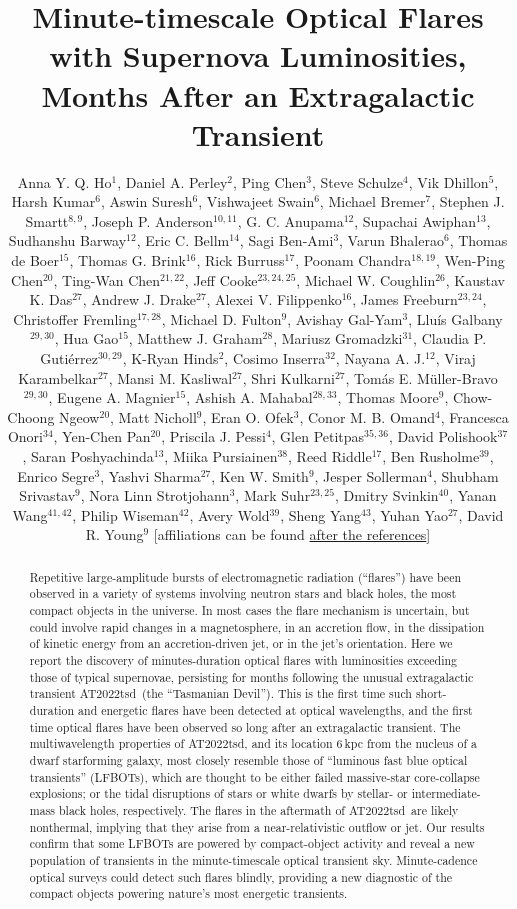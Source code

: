 \documentclass{nature_plusfigure}
\title{Minute-timescale Optical Flares with Supernova Luminosities, Months After an Extragalactic Transient}
\author{Anna Y. Q. Ho$^{1}$, Daniel A. Perley$^{2}$, Ping Chen$^{3}$, Steve Schulze$^{4}$, Vik Dhillon$^{5}$, Harsh Kumar$^{6}$, Aswin Suresh$^{6}$, Vishwajeet Swain$^{6}$, Michael Bremer$^{7}$, Stephen J. Smartt$^{8,9}$, Joseph P. Anderson$^{10,11}$, G. C. Anupama$^{12}$, Supachai Awiphan$^{13}$, Sudhanshu Barway$^{12}$, Eric C. Bellm$^{14}$, Sagi Ben-Ami$^{3}$, Varun Bhalerao$^{6}$, Thomas de Boer$^{15}$, Thomas G. Brink$^{16}$, Rick Burruss$^{17}$, Poonam Chandra$^{18,19}$, Wen-Ping Chen$^{20}$, Ting-Wan Chen$^{21,22}$, Jeff Cooke$^{23,24,25}$, Michael W. Coughlin$^{26}$, Kaustav K. Das$^{27}$, Andrew J. Drake$^{27}$, Alexei V. Filippenko$^{16}$, James Freeburn$^{23,24}$, Christoffer Fremling$^{17,28}$, Michael D. Fulton$^{9}$, Avishay Gal-Yam$^{3}$, Llu\'is Galbany$^{29,30}$, Hua Gao$^{15}$, Matthew J. Graham$^{28}$, Mariusz Gromadzki$^{31}$, Claudia P. Guti\'errez$^{30,29}$, K-Ryan Hinds$^{2}$, Cosimo Inserra$^{32}$, Nayana A. J.$^{12}$, Viraj Karambelkar$^{27}$, Mansi M. Kasliwal$^{27}$, Shri Kulkarni$^{27}$, Tom\'as E. M\"uller-Bravo$^{29,30}$, Eugene A. Magnier$^{15}$, Ashish A. Mahabal$^{28,33}$, Thomas Moore$^{9}$, Chow-Choong Ngeow$^{20}$, Matt Nicholl$^{9}$, Eran O. Ofek$^{3}$, Conor M. B. Omand$^{4}$, Francesca Onori$^{34}$, Yen-Chen Pan$^{20}$, Priscila J. Pessi$^{4}$, Glen Petitpas$^{35,36}$, David Polishook$^{37}$, Saran Poshyachinda$^{13}$, Miika Pursiainen$^{38}$, Reed Riddle$^{17}$, Ben Rusholme$^{39}$, Enrico Segre$^{3}$, Yashvi Sharma$^{27}$, Ken W. Smith$^{9}$, Jesper Sollerman$^{4}$, Shubham Srivastav$^{9}$, Nora Linn Strotjohann$^{3}$, Mark Suhr$^{23,25}$, Dmitry Svinkin$^{40}$, Yanan Wang$^{41,42}$, Philip Wiseman$^{42}$, Avery Wold$^{39}$, Sheng Yang$^{43}$, Yuhan Yao$^{27}$, David R. Young$^{9}$
[affiliations can be found \hyperref[sec:affiliations]{after the references}]
	}
\newcommand{\at}{AT2022tsd}
\begin{document}
\maketitle

\begin{abstract}

Repetitive large-amplitude bursts of electromagnetic radiation (``flares'') have been observed in a variety of systems involving neutron stars and black holes\cite{Fender1997,Hurley1999,Marrone2008,Racusin2008,Kasliwal2008,CastroTirado2008,Stefanescu2008,Nesci2021}, the most compact objects in the universe. In most cases the flare mechanism is uncertain, but could involve rapid changes in a magnetosphere\cite{Hurley1999,CastroTirado2008,Stefanescu2008}, in an accretion flow\cite{Fender2004,Yuan2014}, in the dissipation of kinetic energy from an accretion-driven jet\cite{Racusin2008}, or in the jet's orientation\cite{Raiteri2017}.
Here we report the discovery of minutes-duration optical flares with luminosities exceeding those of typical supernovae, persisting for months following the unusual extragalactic transient \at\ (the ``Tasmanian Devil'').
This is the first time such short-duration and energetic flares have been detected at optical wavelengths, and the first time optical flares have been observed so long after an extragalactic transient.
The multiwavelength properties of \at, and its location 6\,kpc from the nucleus of a dwarf starforming galaxy, most closely resemble those of ``luminous fast blue optical transients'' (LFBOTs\cite{Greiner2015,Prentice2018,RiveraSandoval2018,Perley2019,Margutti2019,Ho2019,Coppejans2020,Ho2020_Koala,Perley2021,Bright2022,Ho2022_AT2020xnd,Yao2022}), which are thought to be either failed massive-star core-collapse explosions\cite{Prentice2018,Margutti2019,Perley2019}; or the tidal disruptions of stars\cite{Metzger2022} or white dwarfs\cite{Kuin2019,Perley2019} by stellar- or intermediate-mass black holes, respectively. The flares in the aftermath of \at\ are likely nonthermal, implying that they arise from a near-relativistic outflow or jet. %
Our results confirm that some LFBOTs are powered by compact-object activity
and reveal a new population of transients in the minute-timescale optical transient sky.
Minute-cadence optical surveys\cite{Ofek2023,Law2022} could detect such flares blindly,
providing a new diagnostic of the compact objects powering nature's most energetic transients.

\end{abstract}
\end{document}

